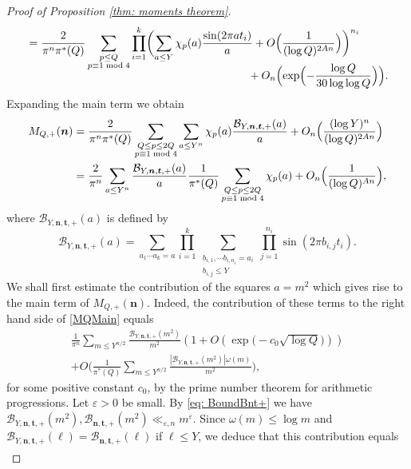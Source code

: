 \documentclass[10pt]{amsart}
\theoremstyle{plain}
\theoremstyle{definition}
\newcommand{\B}{\mathcal{B}}
\newcommand{\un}{\boldsymbol{n}}
\newcommand{\ut}{\boldsymbol{t}}
\begin{document}
\begin{proof}[Proof of Proposition \ref{thm: moments theorem}]
\begin{align*}
&= \frac{2}{\pi^n\pi^*(Q)}\sum_{\substack{p\leq Q\\ p\equiv 1\bmod 4}}\prod_{i=1}^k \biggl(\sum_{a\leq Y} \chi_p(a) \frac{\sin(2\pi at_i)}{a}+ O\Bigl(\frac{1}{(\log Q)^{2An}}\Bigr)\biggr)^{n_i}\\[-10pt]
& \hspace*{7cm} + O_n\Bigl(\exp\Bigl(-\frac{\log Q}{30\log\log Q}\Bigr)\Bigr).
\end{align*}
Expanding the main term we obtain
\begin{equation}\label{MQMain}
\begin{aligned}
M_{Q, +}(\un)
&= \frac{2}{\pi^n\pi^*(Q)}\sum_{\substack{Q\leq p\leq 2Q\\ p\equiv 1\bmod 4}}\sum_{a\leq Y^n}\chi_p(a) \frac{\B_{Y,\un, \ut, +}(a)}{a} +O _n\Bigl(\frac{(\log Y)^n}{(\log Q)^{2An}}\Bigr)\\
&= \frac{2}{\pi^n}\sum_{a\leq Y^n}\frac{\B_{Y,\un, \ut, +}(a)}{a} \frac{1}{\pi^*(Q)}\sum_{\substack{Q\leq p\leq 2Q\\ p\equiv 1\bmod 4}}\chi_p(a) +O_n\Bigl(\frac{1}{(\log Q)^{An}}\Bigr),
\end{aligned}
\end{equation}
where $\B_{Y,\un, \ut, +}(a)$ is defined by
\[\B_{Y,\un, \ut, +}(a)=
\sum_{a_{1}\cdots a_{k} = a} \prod_{i = 1}^k \sum_{\substack{b_{i,1}, \cdots b_{i,n_i} = a_i \\ b_{i,j} \leq Y}} \prod_{j = 1}^{n_i} \sin(2 \pi b_{i,j} t_i).\]
We shall first estimate the contribution of the squares $a=m^2$ which gives rise to the main term of $M_{Q, +}(\un)$. Indeed, the contribution of these terms to the right hand side of \eqref{MQMain} equals
\begin{multline*}
\frac{1}{\pi^n}\sum_{m\leq Y^{n/2}}\frac{\B_{Y,\un, \ut, +}(m^2)}{m^2} \left(1+O\left(\exp\bigl(-c_0\sqrt{\log Q}\bigr)\right)\right) \\
+ O\biggl(\frac{1}{\pi^*(Q)}\sum_{m\leq Y^{n/2}}\frac{|\B_{Y,\un, \ut, +}(m^2)|\omega(m)}{m^2}\biggr),
\end{multline*}
for some positive constant $c_0$, by the prime number theorem for arithmetic progressions.
Let $\varepsilon>0$ be small. By \eqref{eq: BoundBnt+} we have $\B_{Y,\un, \ut, +}(m^2), \B_{\un, \ut, +}(m^2)\ll_{\varepsilon, n} m^{\varepsilon}$. Since $\omega(m)\leq \log m$ and $\B_{Y,\un, \ut, +}(\ell)= \B_{\un, \ut, +}(\ell)$ if $\ell\leq Y$, we deduce that this contribution equals
\begin{equation}\label{SquaresContrib}
\begin{aligned}

\end{aligned}
\end{equation}
\end{proof}
\end{document}
